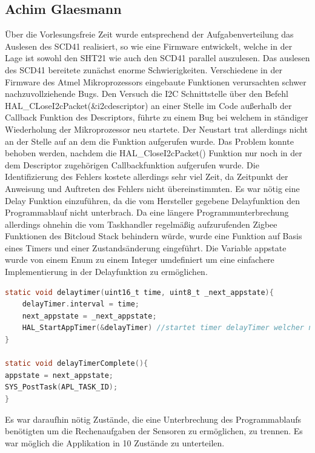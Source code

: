 \documentclass[]{article}
\begin{document}
\subsection{Achim Glaesmann}
Über die Vorlesungsfreie Zeit wurde entsprechend der Aufgabenverteilung das Auslesen des SCD41 realisiert, so wie eine Firmware entwickelt, welche in der Lage ist sowohl den SHT21 wie auch den SCD41 parallel auszulesen. Das auslesen des SCD41 bereitete zunächst enorme Schwierigkeiten. Verschiedene in der Firmware des Atmel Mikroprozessors eingebaute Funktionen verursachten schwer nachzuvollziehende Bugs. Den Versuch die I2C Schnittstelle über den Befehl HAL_CLoseI2cPacket(&i2cdescriptor) an einer Stelle im Code außerhalb der Callback Funktion des Descriptors, führte zu einem Bug bei welchem in ständiger Wiederholung der Mikroprozessor neu startete. Der Neustart trat allerdings nicht an der Stelle auf an dem die Funktion aufgerufen wurde. Das Problem konnte behoben werden, nachdem die HAL_CloseI2cPacket() Funktion nur noch in der dem Descriptor zugehörigen Callbackfunktion aufgerufen wurde. Die Identifizierung des Fehlers kostete allerdings sehr viel Zeit, da Zeitpunkt der Anweisung und Auftreten des Fehlers nicht übereinstimmten.
Es war nötig eine Delay Funktion einzuführen, da die vom Hersteller gegebene Delayfunktion den Programmablauf nicht unterbrach. Da eine längere Programmunterbrechung allerdings ohnehin die vom Taskhandler regelmäßig aufzurufenden Zigbee Funktionen des Bitcloud Stack behindern würde, wurde eine Funktion auf Basis eines Timers und einer Zustandsänderung eingeführt. Die Variable appstate wurde von einem Enum zu einem Integer umdefiniert um eine einfachere Implementierung in der Delayfunktion zu ermöglichen. 

\begin{lstlisting}[language=C,frame=single, caption = Delay Timer, label = delay_timer] 
static void delaytimer(uint16_t time, uint8_t _next_appstate){
	delayTimer.interval = time;
	next_appstate = _next_appstate;
	HAL_StartAppTimer(&delayTimer) //startet timer delayTimer welcher nach der angegebenen Zeit in ms die Funktion delayTimerComplete(); aufruft
}

static void delayTimerComplete(){
appstate = next_appstate;
SYS_PostTask(APL_TASK_ID); 
}

\end{lstlisting} 

Es war daraufhin nötig Zustände, die eine Unterbrechung des Programmablaufs benötigten um die Rechenaufgaben der Sensoren zu ermöglichen, zu trennen. Es war möglich die Applikation in 10 Zustände zu unterteilen.
\end{document}
